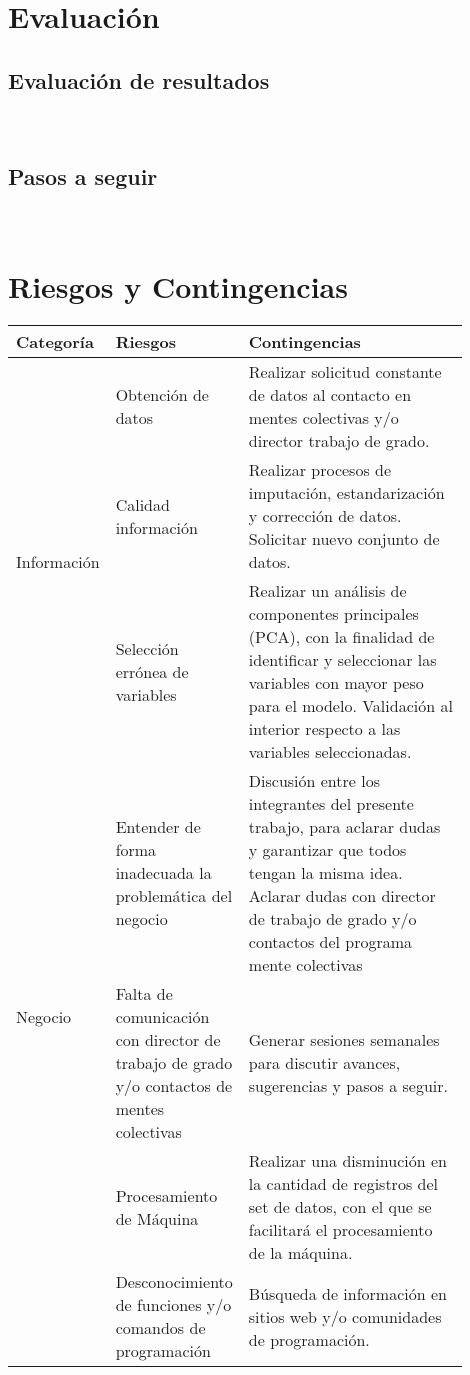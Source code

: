 \section{Evaluación}
\blindtext
\subsection{Evaluación de resultados}
\blindtext\\
\subsection{Pasos a seguir}
\blindtext\\


\section{Riesgos y Contingencias}

\begin{center}
\begin{table}

\begin{tabular}{|p{0.15\linewidth} | p{0.25\linewidth}| p{0.5\linewidth}|}
    \hline
    Categoría & Riesgos & Contingencias \\
    \hline \hline 
    \multirow{3}{4em}{Información} 
    & Obtención de datos 
    & Realizar solicitud constante de datos al contacto en mentes colectivas y/o director trabajo de grado. \\
    \cline{2-3}
    & Calidad información  
    & Realizar procesos de imputación, estandarización y corrección de datos. Solicitar nuevo conjunto de datos. \\
    \cline{2-3}
    & Selección errónea de variables 
    & Realizar un análisis de componentes principales (PCA), con la finalidad de identificar y seleccionar las variables con mayor peso para el modelo. Validación al interior respecto a las variables seleccionadas. \\
    \hline
 
    \multirow{3}{4em}{Negocio} 
    & Entender de forma inadecuada la problemática del negocio 
    & Discusión entre los integrantes del presente trabajo, para aclarar dudas y garantizar que todos tengan la misma idea. 
    Aclarar dudas con director de trabajo de grado y/o contactos del programa mente colectivas  \\
    \cline{2-3}
    & Falta de comunicación con director de trabajo de grado y/o contactos de mentes colectivas
    & Generar sesiones semanales para discutir avances, sugerencias y pasos a seguir. \\
    \hline
    
    \multirow{3}{4em}{Técnicos} 
    & Procesamiento de Máquina 	
    & Realizar una disminución en la cantidad de registros del set de datos, con el que se facilitará el procesamiento de la máquina.    \\
    \cline{2-3}
    & Desconocimiento de funciones y/o comandos de programación
    & Búsqueda de información en sitios web y/o comunidades de programación. \\
    \hline
\end{tabular}
\end{table}
\end{center}
